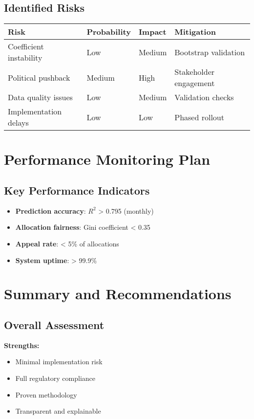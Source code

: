 \subsection{Identified Risks}

\begin{center}
\begin{tabular}{llll}
\toprule
Risk & Probability & Impact & Mitigation \\
\midrule
Coefficient instability & Low & Medium & Bootstrap validation \\
Political pushback & Medium & High & Stakeholder engagement \\
Data quality issues & Low & Medium & Validation checks \\
Implementation delays & Low & Low & Phased rollout \\
\bottomrule
\end{tabular}
\end{center}

\section{Performance Monitoring Plan}

\subsection{Key Performance Indicators}

\begin{itemize}
    \item \textbf{Prediction accuracy}: $R^2$ > 0.795 (monthly)
    \item \textbf{Allocation fairness}: Gini coefficient < 0.35
    \item \textbf{Appeal rate}: < 5\% of allocations
    \item \textbf{System uptime}: > 99.9\%
\end{itemize}

\section{Summary and Recommendations}

\subsection{Overall Assessment}

\textbf{Strengths:}
\begin{itemize}
    \item Minimal implementation risk
    \item Full regulatory compliance
    \item Proven methodology
    \item Transparent and explainable
\end{itemize}

